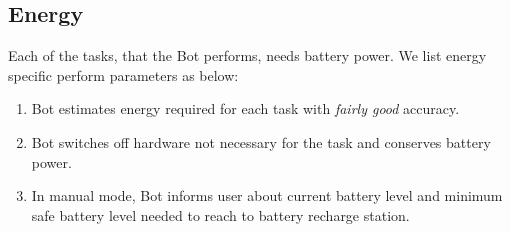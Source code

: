 \documentclass[a4paper, 12pt]{article}
\begin{document}
\subsection{Energy}
Each of the tasks, that the Bot performs, needs battery power. We list energy specific perform parameters as below:
\begin{enumerate}
 \item Bot estimates energy required for each task with \emph{fairly good} accuracy.
 \item Bot switches off hardware not necessary for the task and conserves battery power.
 \item In manual mode, Bot informs user about current battery level and minimum safe battery level needed to 
 reach to battery recharge station.
\end{enumerate}


\end{document}
